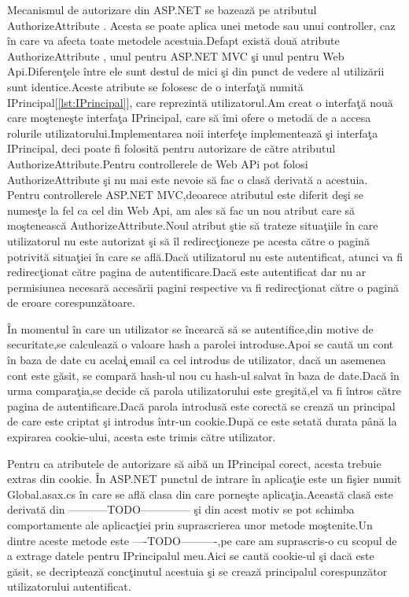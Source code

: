 \documentclass[a4paper,12pt]{report}
\let\oldref\ref
\renewcommand{\ref}[1]{[\oldref{#1}]}
\begin{document}
Mecanismul de autorizare din ASP.NET se bazeaz\u a pe atributul AuthorizeAttribute . Acesta se poate aplica unei metode
sau unui controller, caz \^in care va afecta toate metodele acestuia.Defapt exist\u a dou\u a atribute AuthorizeAttribute ,
unul pentru ASP.NET MVC \c si unul pentru Web Api.Diferen\c tele \^intre ele sunt destul de mici \c si din punct de vedere al utiliz\u arii
sunt identice.Aceste atribute se folosesc de o interfa\c t\u a numit\u a IPrincipal\ref{lst:IPrincipal}, care reprezint\u a utilizatorul.Am creat o interfa\c t\u a nou\u a care mo\c stene\c ste 
interfa\c ta IPrincipal, care s\u a \^imi ofere o metod\u a de a accesa rolurile utilizatorului.Implementarea noii interfe\c te implementeaz\u a
\c si interfa\c ta IPrincipal, deci poate fi folosit\u a pentru autorizare de c\u atre atributul AuthorizeAttribute.Pentru 
controllerele de Web APi pot folosi AuthorizeAttribute  \c si nu mai este nevoie s\u a fac o clas\u a derivat\u a a acestuia.
Pentru controllerele ASP.NET MVC,deoarece atributul este diferit de\c si se numes\c te la fel ca cel din Web Api, am ales s\u a
fac un nou atribut care s\u a mo\c steneasc\u a AuthorizeAttribute.Noul atribut \c stie s\u a trateze situa\c tiile 
\^in care utilizatorul nu este autorizat \c si s\u a \^il redirec\c tioneze pe acesta c\u atre o pagin\u a potrivit\u a situa\c tiei \^in 
care se afl\u a.Dac\u a utilizatorul nu este autentificat, atunci va fi redirec\c tionat c\u atre pagina de autentificare.Dac\u a 
este autentificat dar nu ar permisiunea necesar\u a acces\u arii pagini respective va fi redirec\c tionat c\u atre o pagin\u a de eroare 
corespunz\u atoare.

\^In momentul \^in care un utilizator se \^incearc\u a s\u a se autentifice,din motive de securitate,se calculeaz\u a o valoare hash a parolei
introduse.Apoi se caut\u a un cont \^in baza de date cu acela\c i email ca cel introdus de utilizator, dac\u a un asemenea cont este g\u asit,
se compar\u a hash-ul nou cu hash-ul salvat \^in baza de date.Dac\u a \^in urma compara\c tia,se decide c\u a parola utilizatorului este gre\c sit\u a,el
va fi \^intros c\u atre pagina de autentificare.Dac\u a parola introdus\u a este corect\u a se creaz\u a un principal de care este criptat \c si 
introdus \^intr-un cookie.Dup\u a ce este setat\u a durata p\^an\u a la expirarea cookie-ului, acesta este trimis c\u atre utilizator.

Pentru ca atributele de autorizare s\u a aib\u a un IPrincipal corect, acesta trebuie extras din cookie.
\^In ASP.NET punctul de intrare \^in aplica\c tie este un fi\c sier numit Global.asax.cs \^in care se 
afl\u a clasa din care porne\c ste aplica\c tia.Aceast\u a clas\u a este derivat\u a din -----------TODO--------------
\c si din acest motiv se pot schimba comportamente ale aplicac\c tiei prin suprascrierea 
unor metode mo\c stenite.Un dintre aceste metode este ----TODO----------,pe care am suprascris-o 
cu scopul de a extrage datele pentru IPrincipalul meu.Aici se caut\u a cookie-ul \c si dac\u a este 
g\u asit, se decripteaz\u a conc\c tinutul acestuia \c si se creaz\u a principalul corespunz\u ator 
utilizatorului autentificat.
\end{document}
